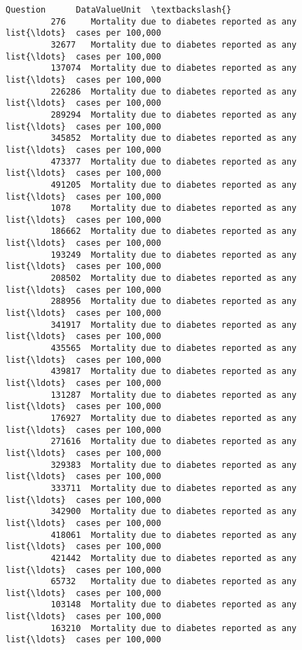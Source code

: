 \documentclass[11pt]{article}
\begin{document}
\begin{Verbatim}[commandchars=\\\{\}]
                                                          Question      DataValueUnit  \textbackslash{}
         276     Mortality due to diabetes reported as any list{\ldots}  cases per 100,000   
         32677   Mortality due to diabetes reported as any list{\ldots}  cases per 100,000   
         137074  Mortality due to diabetes reported as any list{\ldots}  cases per 100,000   
         226286  Mortality due to diabetes reported as any list{\ldots}  cases per 100,000   
         289294  Mortality due to diabetes reported as any list{\ldots}  cases per 100,000   
         345852  Mortality due to diabetes reported as any list{\ldots}  cases per 100,000   
         473377  Mortality due to diabetes reported as any list{\ldots}  cases per 100,000   
         491205  Mortality due to diabetes reported as any list{\ldots}  cases per 100,000   
         1078    Mortality due to diabetes reported as any list{\ldots}  cases per 100,000   
         186662  Mortality due to diabetes reported as any list{\ldots}  cases per 100,000   
         193249  Mortality due to diabetes reported as any list{\ldots}  cases per 100,000   
         208502  Mortality due to diabetes reported as any list{\ldots}  cases per 100,000   
         288956  Mortality due to diabetes reported as any list{\ldots}  cases per 100,000   
         341917  Mortality due to diabetes reported as any list{\ldots}  cases per 100,000   
         435565  Mortality due to diabetes reported as any list{\ldots}  cases per 100,000   
         439817  Mortality due to diabetes reported as any list{\ldots}  cases per 100,000   
         131287  Mortality due to diabetes reported as any list{\ldots}  cases per 100,000   
         176927  Mortality due to diabetes reported as any list{\ldots}  cases per 100,000   
         271616  Mortality due to diabetes reported as any list{\ldots}  cases per 100,000   
         329383  Mortality due to diabetes reported as any list{\ldots}  cases per 100,000   
         333711  Mortality due to diabetes reported as any list{\ldots}  cases per 100,000   
         342900  Mortality due to diabetes reported as any list{\ldots}  cases per 100,000   
         418061  Mortality due to diabetes reported as any list{\ldots}  cases per 100,000   
         421442  Mortality due to diabetes reported as any list{\ldots}  cases per 100,000   
         65732   Mortality due to diabetes reported as any list{\ldots}  cases per 100,000   
         103148  Mortality due to diabetes reported as any list{\ldots}  cases per 100,000   
         163210  Mortality due to diabetes reported as any list{\ldots}  cases per 100,000   

\end{Verbatim}
\end{document}

